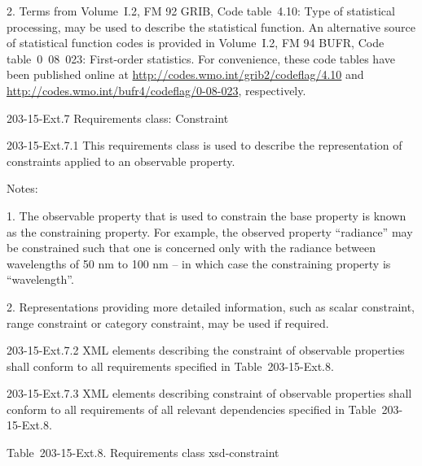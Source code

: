2. Terms from Volume~I.2, FM 92 GRIB, Code table~4.10: Type of statistical processing, may be used to describe the statistical function. An alternative source of statistical function codes is provided in Volume~I.2, FM 94 BUFR, Code table~0~08~023: First-order statistics. For convenience, these code tables have been published online at \url{http://codes.wmo.int/grib2/codeflag/4.10} and \url{http://codes.wmo.int/bufr4/codeflag/0-08-023}, respectively.

203-15-Ext.7 Requirements class: Constraint

203-15-Ext.7.1 This requirements class is used to describe the representation of constraints applied to an observable property.

Notes:

1. The observable property that is used to constrain the base property is known as the constraining property. For example, the observed property ``radiance'' may be constrained such that one is concerned only with the radiance between wavelengths of 50 nm to 100 nm -- in which case the constraining property is ``wavelength''.

2. Representations providing more detailed information, such as scalar constraint, range constraint or category constraint, may be used if required.

203-15-Ext.7.2 XML elements describing the constraint of observable properties shall conform to all requirements specified in Table~203-15-Ext.8.

203-15-Ext.7.3 XML elements describing constraint of observable properties shall conform to all requirements of all relevant dependencies specified in Table~203-15-Ext.8.

Table~203-15-Ext.8. Requirements class xsd-constraint

